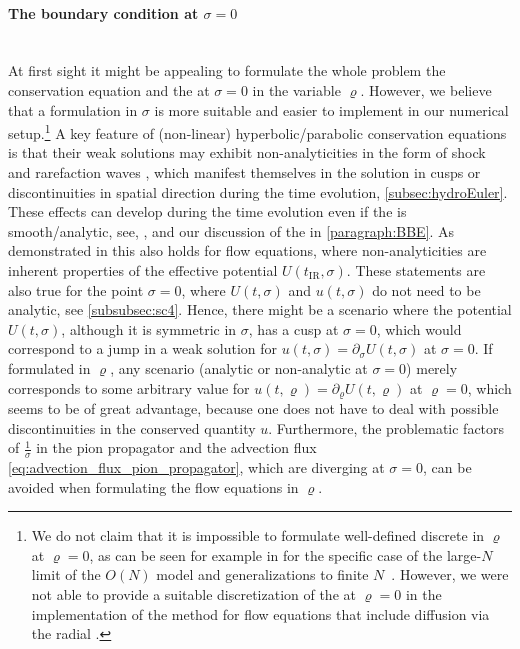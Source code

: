 \paragraph{The boundary condition at $\sigma = 0$}\label{paragraph:BC0}\mbox{}\\
At first sight it might be appealing to formulate the whole problem \dash{} the conservation equation and the \bc{} at $\sigma = 0$ \dash{} in the variable $\varrho$.
However, we believe that a formulation in $\sigma$ is more suitable and easier to implement in our numerical \fv{} setup.\footnote{%
	We do not claim that it is impossible to formulate well-defined discrete \bcs{} in $\varrho$ at $\varrho = 0$, as can be seen for example in  for the specific case of the large-$N$ limit of the $O(N)$ model and generalizations to finite $N$~\cite{Ihssen:2022xkr,Ihssen:2023xlp}. 
	However, we were not able to provide a suitable discretization of the \bc{} at $\varrho = 0$ in the implementation of the \fv{} method for flow equations that include diffusion via the radial \sigmaMode{}.
}
A key feature of (non-linear) hyperbolic/parabolic conservation equations is that their weak solutions may exhibit non-analyticities in the form of shock and rarefaction waves \etc{}, which manifest themselves in the solution in cusps or discontinuities in spatial direction during the time evolution, \cf{} \cref{subsec:hydroEuler}.
These effects can develop during the time evolution even if the \ic{} is smooth/analytic, see, \eg{},  and our discussion of the \bbeq{} in \cref{paragraph:BBE}.
As demonstrated in  this also holds for \frg{} flow equations, where non-analyticities are inherent properties of the effective \ir{} potential $U ( t_\mathrm{IR}, \sigma )$.
These statements are also true for the point $\sigma = 0$, where $U ( t, \sigma )$ and $u ( t, \sigma )$ do not need to be analytic, see \cref{subsubsec:sc4}.
Hence, there might be a scenario where the potential $U ( t, \sigma )$, although it is symmetric in $\sigma$, has a cusp at $\sigma = 0$, which would correspond to a jump in a weak solution for $u ( t, \sigma ) = \partial_\sigma U ( t, \sigma )$ at $\sigma = 0$.
If formulated in $\varrho$, any scenario (analytic or non-analytic at $\sigma = 0$) merely corresponds to some arbitrary value for $u ( t, \varrho ) = \partial_\varrho U ( t, \varrho )$ at $\varrho = 0$, which seems to be of great advantage, because one does not have to deal with possible discontinuities in the conserved quantity $u$.
Furthermore, the problematic factors of $\frac{1}{\sigma}$ in the pion propagator and the advection flux \eqref{eq:advection_flux_pion_propagator}, which are diverging at $\sigma = 0$, can be avoided when formulating the flow equations in $\varrho$.

